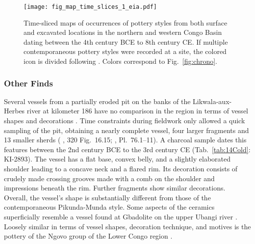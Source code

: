 \documentclass[smallextended,natbib]{svjour3}       %
\begin{document}
\begin{figure}[!tbp]
	\centering
	\texttt{[image: fig\_map\_time\_slices\_1\_eia.pdf]}
	\caption{Time-sliced maps of occurrences of pottery styles from both surface and excavated locations in the northern and western Congo Basin dating between the 4th century BCE to 8th century CE. If multiple contemporaneous pottery styles were recorded at a site, the colored icon is divided following \citet[218--244 Fig.~100--107]{Seidensticker.2021e}. Colors correspond to Fig.~\ref{fig:chrono}.}
	\label{fig:timeslices_1_eia}
\end{figure}

\subsubsection*{Other Finds}

Several vessels from a partially eroded pit on the banks of the Likwala-aux-Herbes river at kilometer 186 have no comparison in the region in terms of vessel shapes and decorations \citep[165--168, 339--340]{Seidensticker.2021e}. Time constraints during fieldwork only allowed a quick sampling of the pit, obtaining a nearly complete vessel, four larger fragments and 13 smaller sherds (\citeauthor{Eggert.1993} \citeyear{Eggert.1993}, 320 Fig.~16.15; \citeauthor{Seidensticker.2021e} \citeyear{Seidensticker.2021e}, Pl.~76.1--11). A charcoal sample dates this features between the 2nd century BCE to the 3rd century CE (Tab.~\ref{tab:14Cold}: KI-2893). The vessel has a flat base, convex belly, and a slightly elaborated shoulder leading to a concave neck and a flared rim. Its decoration consists of crudely made crossing grooves made with a comb on the shoulder and impressions beneath the rim. Further fragments show similar decorations. Overall, the vessel's shape is substantially different from those of the contemporaneous Pikunda-Munda style. Some aspects of the ceramics superficially resemble a vessel found at Gbadolite on the upper Ubangi river \citep[277--278 Fig.~7]{Eggert.1984}. Loosely similar in terms of vessel shapes, decoration technique, and motives is the pottery of the Ngovo group of the Lower Congo region \citep[167 Fig.~81]{deMaret.1986,Seidensticker.2021e}.
\end{document}
